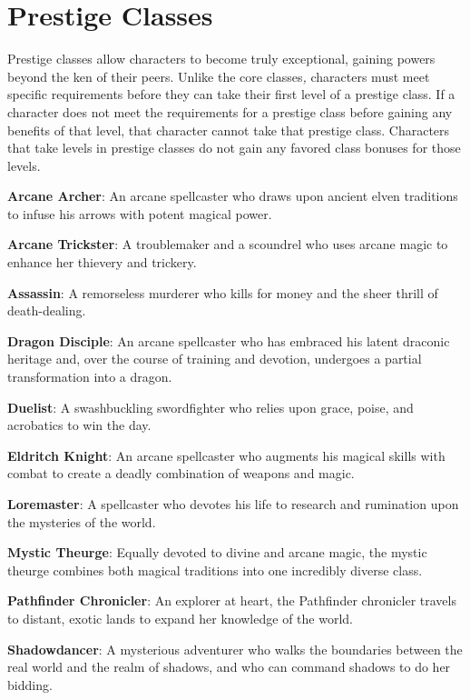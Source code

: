 \chapter{Prestige Classes}

\label{f0}				
Prestige classes allow characters to become truly exceptional, gaining powers beyond the ken of their peers. Unlike the core classes\textit{, }characters must meet specific requirements before they can take their first level of a prestige class. If a character does not meet the requirements for a prestige class before gaining any benefits of that level, that character cannot take that prestige class. Characters that take levels in prestige classes do not gain any favored class bonuses for those levels.
				
\textbf{Arcane Archer}: An arcane spellcaster who draws upon ancient elven traditions to infuse his arrows with potent magical power.
				
\textbf{Arcane Trickster}: A troublemaker and a scoundrel who uses arcane magic to enhance her thievery and trickery.
				
\textbf{Assassin}: A remorseless murderer who kills for money and the sheer thrill of death-dealing.
				
\textbf{Dragon Disciple}: An arcane spellcaster who has embraced his latent draconic heritage and, over the course of training and devotion, undergoes a partial transformation into a dragon.
				
\textbf{Duelist}: A swashbuckling swordfighter who relies upon grace, poise, and acrobatics to win the day.
				
\textbf{Eldritch Knight}: An arcane spellcaster who augments his magical skills with combat to create a deadly combination of weapons and magic.
				
\textbf{Loremaster}: A spellcaster who devotes his life to research and rumination upon the mysteries of the world.
				
\textbf{Mystic Theurge}: Equally devoted to divine and arcane magic, the mystic theurge combines both magical traditions into one incredibly diverse class.
				
\textbf{Pathfinder Chronicler}: An explorer at heart, the Pathfinder chronicler travels to distant, exotic lands to expand her knowledge of the world. 
				
\textbf{Shadowdancer}: A mysterious adventurer who walks the boundaries between the real world and the realm of shadows, and who can command shadows to do her bidding.
				
